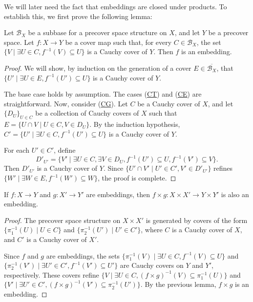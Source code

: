 \documentclass[pdflatex,sn-mathphys-num]{sn-jnl}
\newcommand{\axref}[1]{(\hyperref[ax:#1]{#1})}
\theoremstyle{definition}
\theoremstyle{remark}
\numberwithin{figure}{section}
\begin{document}
We will later need the fact that embeddings are closed under products.
To establish this, we first prove the following lemma:

\begin{lem}
Let $\mathcal{B}_X$ be a subbase for a precover space structure on $X$, and let $Y$ be a precover space.
Let $f : X \to Y$ be a cover map such that, for every $C \in \mathcal{B}_X$, the set $\{ V \mid \exists U \in C, f^{-1}(V) \subseteq U \}$ is a Cauchy cover of $Y$.
Then $f$ is an embedding.
\end{lem}
\begin{proof}
We will show, by induction on the generation of a cover $E \in \overline{\mathcal{B}_X}$, that $\{ U' \mid \exists U \in E, f^{-1}(U') \subseteq U \}$ is a Cauchy cover of $Y$.

The base case holds by assumption.
The cases \axref{CT} and \axref{CE} are straightforward.
Now, consider \axref{CG}.
Let $C$ be a Cauchy cover of $X$, and let $\{ D_U \}_{U \in C}$ be a collection of Cauchy covers of $X$ such that $E = \{ U \cap V \mid U \in C, V \in D_U \}$.
By the induction hypothesis, $C' = \{ U' \mid \exists U \in C, f^{-1}(U') \subseteq U \}$ is a Cauchy cover of $Y$.

For each $U' \in C'$, define
\[ D'_{U'} = \{ V' \mid \exists U \in C, \exists V \in D_U, f^{-1}(U') \subseteq U, f^{-1}(V') \subseteq V \}. \]
Then $D'_{U'}$ is a Cauchy cover of $Y$.
Since $\{ U' \cap V' \mid U' \in C', V' \in D'_{U'} \}$ refines $\{ W' \mid \exists W \in E, f^{-1}(W') \subseteq W \}$, the proof is complete.
\end{proof}

\begin{lem}
If $f : X \to Y$ and $g : X' \to Y'$ are embeddings, then $f \times g : X \times X' \to Y \times Y'$ is also an embedding.
\end{lem}
\begin{proof}
The precover space structure on $X \times X'$ is generated by covers of the form $\{ \pi_1^{-1}(U) \mid U \in C \}$ and $\{ \pi_2^{-1}(U') \mid U' \in C' \}$,
where $C$ is a Cauchy cover of $X$, and $C'$ is a Cauchy cover of $X'$.

Since $f$ and $g$ are embeddings, the sets $\{ \pi_1^{-1}(V) \mid \exists U \in C, f^{-1}(V) \subseteq U \}$
and $\{ \pi_2^{-1}(V') \mid \exists U' \in C', f^{-1}(V') \subseteq U' \}$ are Cauchy covers on $Y$ and $Y'$, respectively.
These covers refine $\{ V \mid \exists U \in C, (f \times g)^{-1}(V) \subseteq \pi_1^{-1}(U) \}$
and $\{ V' \mid \exists U' \in C', (f \times g)^{-1}(V') \subseteq \pi_2^{-1}(U') \}$.
By the previous lemma, $f \times g$ is an embedding.
\end{proof}
\end{document}
